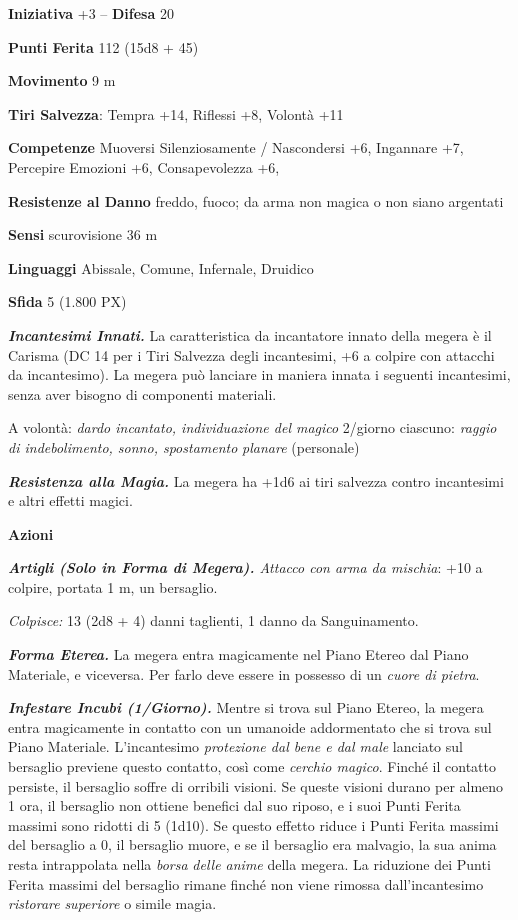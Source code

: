 \begin{multicols}{2}
	\textbf{Iniziativa} +3 -- \textbf{Difesa} 20

	\textbf{Punti Ferita} 112 (15d8 + 45)

	\textbf{Movimento} 9 m

	\textbf{Tiri Salvezza}: Tempra +14, Riflessi +8, Volontà +11

	\textbf{Competenze} Muoversi Silenziosamente / Nascondersi +6, Ingannare +7, Percepire Emozioni +6, Consapevolezza +6,

	\textbf{Resistenze al Danno} freddo, fuoco; da arma non magica o non siano argentati

	\textbf{Sensi} scurovisione 36 m

	\textbf{Linguaggi} Abissale, Comune, Infernale, Druidico

	\textbf{Sfida} 5 (1.800 PX)

	\textit{\textbf{Incantesimi Innati.}} La caratteristica da incantatore innato della megera è il Carisma (DC 14 per i Tiri Salvezza degli incantesimi, +6 a colpire con attacchi da incantesimo). La megera può lanciare in maniera innata i seguenti incantesimi, senza aver bisogno di
	componenti materiali.

	A volontà: \textit{dardo incantato, individuazione del magico} 2/giorno ciascuno: \textit{raggio di indebolimento, sonno, spostamento} \textit{planare} (personale)

	\textit{\textbf{Resistenza alla Magia.}} La megera ha +1d6 ai tiri salvezza contro incantesimi e altri effetti magici.

	\textbf{Azioni}

	\textit{\textbf{Artigli (Solo in Forma di Megera).} Attacco con arma da mischia}: +10 a colpire, portata 1 m, un bersaglio.

	\textit{Colpisce:} 13 (2d8 + 4) danni taglienti, 1 danno da Sanguinamento.

	\textit{\textbf{Forma Eterea.}} La megera entra magicamente nel Piano Etereo dal Piano Materiale, e viceversa. Per farlo deve essere in possesso di un \textit{cuore di pietra}.

	\textit{\textbf{Infestare Incubi (1/Giorno).}} Mentre si trova sul Piano Etereo, la megera entra magicamente in contatto con un umanoide addormentato che si trova sul Piano Materiale. L'incantesimo \textit{protezione dal bene e dal male} lanciato sul bersaglio previene questo contatto, così come \textit{cerchio magico}. Finché il contatto persiste, il bersaglio soffre di orribili visioni. Se queste visioni durano per almeno 1 ora, il bersaglio non ottiene benefici dal suo riposo, e i suoi Punti Ferita massimi sono ridotti di 5 (1d10). Se questo effetto riduce i Punti Ferita massimi del bersaglio a 0, il bersaglio muore, e se il bersaglio era malvagio, la sua anima resta intrappolata nella \textit{borsa} \textit{delle anime} della megera. La riduzione dei Punti Ferita massimi del bersaglio rimane finché non viene rimossa dall'incantesimo \textit{ristorare} \textit{superiore} o simile magia.


\end{multicols}
